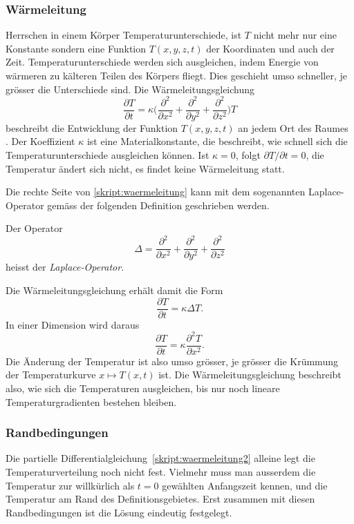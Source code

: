 \subsubsection{Wärmeleitung\label{subsection:heatconduction}}
Herrschen in einem Körper Temperaturunterschiede, ist $T$ nicht mehr
nur eine Konstante sondern eine Funktion $T(x,y,z,t)$
der Koordinaten und auch der Zeit.
Temperaturunterschiede werden sich ausgleichen, indem Energie von
wärmeren zu kälteren Teilen des Körpers fliegt.
Dies geschieht umso schneller, je grösser die Unterschiede sind.
Die Wärmeleitungsgleichung
\begin{equation}
\frac{\partial T}{\partial t}
=
\kappa
\biggl(
\frac{\partial^2}{\partial x^2}
+
\frac{\partial^2}{\partial y^2}
+
\frac{\partial^2}{\partial z^2}
\biggr)
T
\label{skript:waermeleitung}
\end{equation}
beschreibt die Entwicklung der Funktion $T(x,y,z,t)$ an jedem
Ort des Raumes \cite{skript:waermeleitung}.
Der Koeffizient $\kappa$ ist eine Materialkonstante, die beschreibt,
wie schnell sich die Temperaturunterschiede ausgleichen können.
Ist $\kappa=0$, folgt $\partial T/\partial t=0$, die Temperatur 
ändert sich nicht, es findet keine Wärmeleitung statt.

Die rechte Seite von \eqref{skript:waermeleitung} kann mit dem
sogenannten Laplace-Operator gemäss der folgenden Definition 
geschrieben werden.

\begin{definition}
Der Operator
\[
\Delta
=
\frac{\partial^2}{\partial x^2}
+
\frac{\partial^2}{\partial y^2}
+
\frac{\partial^2}{\partial z^2}
\]
heisst der
{\em Laplace-Operator}.
\end{definition}

Die Wärmeleitungsgleichung erhält damit die Form
\begin{equation}
\frac{\partial T}{\partial t}
=
\kappa\Delta T.
\label{skript:waermeleitung2}
\end{equation}
In einer Dimension wird daraus
\[
\frac{\partial T}{\partial t} = \kappa \frac{\partial^2 T}{\partial x^2}.
\]
Die Änderung der Temperatur ist also umso grösser, je grösser
die Krümmung der Temperaturkurve $x\mapsto T(x,t)$ ist.
Die Wärmeleitungsgleichung beschreibt also, wie sich die Temperaturen
ausgleichen, bis nur noch lineare Temperaturgradienten bestehen bleiben.

\subsubsection{Randbedingungen}
Die partielle Differentialgleichung~\eqref{skript:waermeleitung2}
alleine legt die Temperaturverteilung noch nicht fest.
Vielmehr muss man ausserdem die Temperatur zur willkürlich als $t=0$
gewählten Anfangszeit kennen, und die Temperatur am Rand des
Definitionsgebietes.
Erst zusammen mit diesen Randbedingungen ist die Lösung eindeutig festgelegt.


